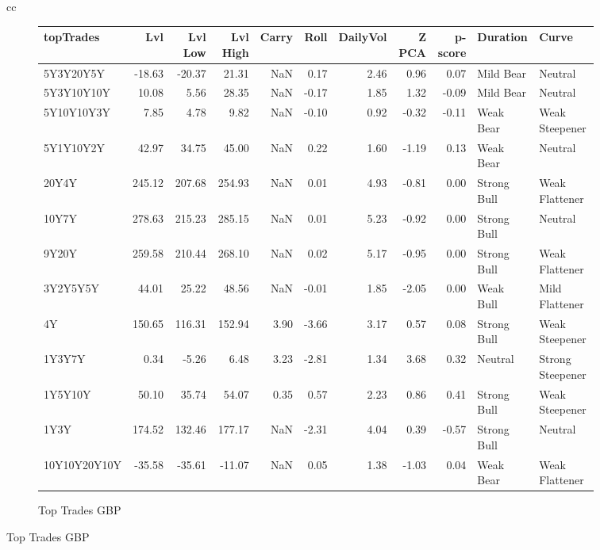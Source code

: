 \documentclass[a4paper,twoside]{report}
\begin{document}
\begin{figure}[htbp]
\begin{tabular}[c]{cc}
\begin{subfigure}[c]{0.5\textwidth}
\caption{Top Trades GBP}
 \label{fig:TopTrades GBP}
\begin{adjustbox}{max width=\textwidth}
\begin{tabular}{lrrrrrrrrll}
\hline
    topTrades &     Lvl &  Lvl Low &  Lvl High &  Carry &  Roll &  DailyVol &  Z PCA &  p-score &     Duration &             Curve \\
\hline
    5Y3Y20Y5Y &  -18.63 &   -20.37 &     21.31 &    NaN &  0.17 &      2.46 &   0.96 &     0.07 &    Mild Bear &           Neutral \\
   5Y3Y10Y10Y &   10.08 &     5.56 &     28.35 &    NaN & -0.17 &      1.85 &   1.32 &    -0.09 &    Mild Bear &           Neutral \\
   5Y10Y10Y3Y &    7.85 &     4.78 &      9.82 &    NaN & -0.10 &      0.92 &  -0.32 &    -0.11 &    Weak Bear &    Weak Steepener \\
    5Y1Y10Y2Y &   42.97 &    34.75 &     45.00 &    NaN &  0.22 &      1.60 &  -1.19 &     0.13 &    Weak Bear &           Neutral \\
        20Y4Y &  245.12 &   207.68 &    254.93 &    NaN &  0.01 &      4.93 &  -0.81 &     0.00 &  Strong Bull &    Weak Flattener \\
        10Y7Y &  278.63 &   215.23 &    285.15 &    NaN &  0.01 &      5.23 &  -0.92 &     0.00 &  Strong Bull &           Neutral \\
        9Y20Y &  259.58 &   210.44 &    268.10 &    NaN &  0.02 &      5.17 &  -0.95 &     0.00 &  Strong Bull &    Weak Flattener \\
     3Y2Y5Y5Y &   44.01 &    25.22 &     48.56 &    NaN & -0.01 &      1.85 &  -2.05 &     0.00 &    Weak Bull &    Mild Flattener \\
           4Y &  150.65 &   116.31 &    152.94 &   3.90 & -3.66 &      3.17 &   0.57 &     0.08 &  Strong Bull &    Weak Steepener \\
       1Y3Y7Y &    0.34 &    -5.26 &      6.48 &   3.23 & -2.81 &      1.34 &   3.68 &     0.32 &      Neutral &  Strong Steepener \\
      1Y5Y10Y &   50.10 &    35.74 &     54.07 &   0.35 &  0.57 &      2.23 &   0.86 &     0.41 &  Strong Bull &    Weak Steepener \\
         1Y3Y &  174.52 &   132.46 &    177.17 &    NaN & -2.31 &      4.04 &   0.39 &    -0.57 &  Strong Bull &           Neutral \\
 10Y10Y20Y10Y &  -35.58 &   -35.61 &    -11.07 &    NaN &  0.05 &      1.38 &  -1.03 &     0.04 &    Weak Bear &    Weak Flattener \\

\end{tabular}
\end{adjustbox}
\end{subfigure}
\end{tabular}
\end{figure}
\end{document}
